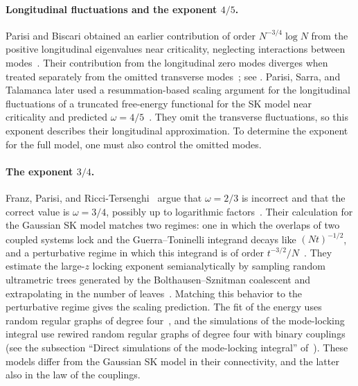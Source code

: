 \paragraph{Longitudinal fluctuations and the exponent $4/5$.}
Parisi and Biscari obtained an earlier contribution of order
$N^{-3/4}\log N$ from the positive longitudinal eigenvalues near
criticality, neglecting interactions between
modes~\cite[Section~1 and Eq.~(5.25)]{ParisiBiscari1992}. Their
contribution from the longitudinal zero modes diverges when treated separately
from the omitted transverse modes~\cite[discussion following
Eq.~(5.27)]{ParisiBiscari1992}; see
\cite[Section~1]{ParisiSarraTalamanca2019}. Parisi, Sarra,
and Talamanca later used a resummation-based scaling argument for the
longitudinal fluctuations of a truncated free-energy functional for the SK model near
criticality and predicted
$\omega=4/5$~\cite[Section~3, Eqs.~(16)--(19)]{ParisiSarraTalamanca2019}.
They omit the transverse fluctuations, so this exponent describes their
longitudinal approximation. To determine the exponent for the full model, one
must also control the omitted modes.

\paragraph{The exponent $3/4$.}
Franz, Parisi, and Ricci-Tersenghi~\cite{FranzParisiRicciTersenghi2026}
argue that $\omega=2/3$ is incorrect and that the correct value is
$\omega=3/4$, possibly up to logarithmic
factors~\cite[Eq.~(14)]{FranzParisiRicciTersenghi2026}. Their
calculation for the Gaussian SK model matches two regimes: one in which the
overlaps of two coupled systems lock and the Guerra--Toninelli
integrand decays like $(Nt)^{-1/2}$, and a perturbative regime in which
this integrand is of order $t^{-3/2}/N$~\cite[Eqs.~(9)--(12) and
(15)--(17)]{FranzParisiRicciTersenghi2026}. They estimate the large-$z$ locking
exponent semianalytically by sampling random ultrametric
trees generated by the Bolthausen--Sznitman coalescent and extrapolating
in the number of leaves~\cite[Materials and Methods]{FranzParisiRicciTersenghi2026}.
Matching this behavior to the perturbative regime gives the scaling
prediction. The
fit of the energy uses random regular graphs of degree
four~\cite[Eq.~(18) and Fig.~2]{FranzParisiRicciTersenghi2026}, and the
simulations of the mode-locking integral use rewired random regular
graphs of degree four with binary couplings (see the subsection
``Direct simulations of the mode-locking integral''
of~\cite[Materials and Methods]{FranzParisiRicciTersenghi2026}). These
models differ from the Gaussian SK model in their connectivity, and the
latter also in the law of the couplings.

